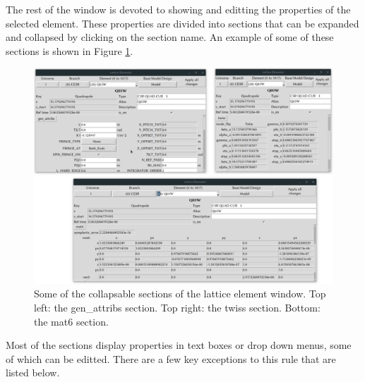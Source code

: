 The rest of the window is devoted to showing and editting the properties of the selected element.
These properties are divided into sections that can be expanded and collapsed by clicking on the section name.
An example of some of these sections is shown in Figure \ref{fig:gui.lat.element.2}.
\begin{figure}
\centering
\includegraphics[width=12cm]{figures/lat_element_2.pdf}
\caption[Some of the collapsable sections of the lattice element window.]{Some of the collapsable sections of the lattice element window.
Top left: the gen_attribs section.
Top right: the twiss section.
Bottom: the mat6 section.}
\label{fig:gui.lat.element.2}
\end{figure}
Most of the sections display properties in text boxes or drop down menus, some of which can be editted.
There are a few key exceptions to this rule that are listed below.

